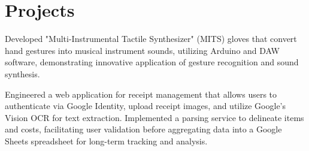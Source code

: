 \documentclass[10pt]{resume-openfont}
\begin{document}
\begin{minipage}[t]{1\textwidth}
\vspace{-4 mm}
\section{Projects}
\titlerule
\vspace{2.5 mm}

Developed "Multi-Instrumental Tactile Synthesizer" (MITS) gloves that convert hand gestures into musical instrument sounds, utilizing Arduino and DAW software, demonstrating innovative application of gesture recognition and sound synthesis.
\sectionsep

Engineered a web application for receipt management that allows users to authenticate via Google Identity, upload receipt images, and utilize Google's Vision OCR for text extraction. Implemented a parsing service to delineate items and costs, facilitating user validation before aggregating data into a Google Sheets spreadsheet for long-term tracking and analysis.
\sectionsep

\end{minipage} 
\end{document}
